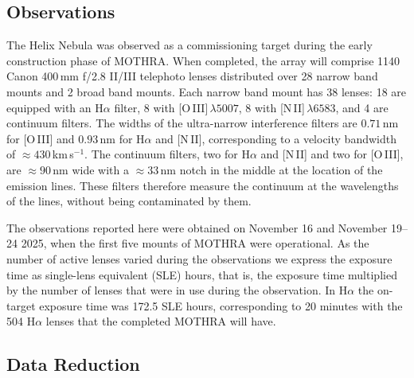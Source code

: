 \documentclass{nature_arxiv}
\newcommand{\kms}{km\,s$^{-1}$}
\begin{document}
\begin{methods}

\subsection{Observations\vspace{0.3cm}\\}


The Helix Nebula was observed as a
commissioning target during the early construction phase of
MOTHRA. When completed, the array will comprise 1140 Canon 400\,mm f/2.8 II/III
telephoto lenses distributed over 28 narrow band mounts and 2
broad band mounts. Each narrow band mount has 38 lenses: 18
are equipped with an H$\alpha$ filter, 8 with [O\,III]\,$\lambda 5007$,
8 with [N\,II]\,$\lambda 6583$, and 4 are continuum filters. The widths of the ultra-narrow
interference filters are $0.71$\,nm for [O\,III] and $0.93$\,nm
for H$\alpha$ and [N\,II], corresponding to a velocity bandwidth of
$\approx 430$\,\kms.
The continuum filters, two for H$\alpha$ and [N\,II] and two for [O\,III],
are $\approx 90$\,nm wide with a $\approx 33$\,nm
notch in the middle at the location of the emission lines. These
filters therefore measure the continuum at the wavelengths of the lines, without
being contaminated by them.

The observations reported here were obtained on November 16 and November 19--24 2025,
when the first five mounts of MOTHRA were operational.
As the number of active lenses varied during the observations
we express the exposure time as single-lens
equivalent (SLE) hours, that is, the exposure time multiplied by the
number of lenses that were in use during the observation.
In H$\alpha$ the on-target
exposure time was 172.5 SLE hours, corresponding to 20 minutes with the
504 H$\alpha$ lenses that the completed MOTHRA will have.



\subsection{Data Reduction\vspace{0.3cm}\\}


\end{methods}
\end{document}

